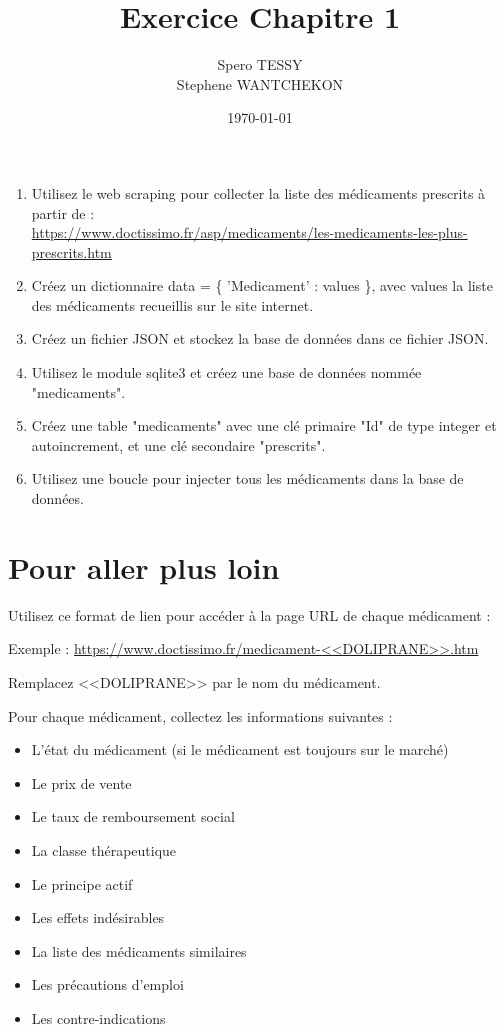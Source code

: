 \documentclass[20pt]{article}
\title{Exercice Chapitre 1}
\author{Spero TESSY \\ Stephene WANTCHEKON}
\date{\today}
\begin{document}
\maketitle

\begin{enumerate}
    \item Utilisez le web scraping pour collecter la liste des médicaments prescrits à partir de : \\ \url{https://www.doctissimo.fr/asp/medicaments/les-medicaments-les-plus-prescrits.htm}
    
    \item Créez un dictionnaire data = \{ 'Medicament' : values \}, avec values la liste des médicaments recueillis sur le site internet.
    
    \item Créez un fichier JSON et stockez la base de données dans ce fichier JSON.
    
    \item Utilisez le module sqlite3 et créez une base de données nommée "medicaments".
    
    \item Créez une table "medicaments" avec une clé primaire "Id" de type integer et autoincrement, et une clé secondaire "prescrits".
    
    \item Utilisez une boucle pour injecter tous les médicaments dans la base de données.
\end{enumerate}

\section{Pour aller plus loin}

Utilisez ce format de lien pour accéder à la page URL de chaque médicament :

Exemple : \url{https://www.doctissimo.fr/medicament-<<DOLIPRANE>>.htm}

Remplacez <<DOLIPRANE>> par le nom du médicament.

Pour chaque médicament, collectez les informations suivantes :

\begin{itemize}
    \item L'état du médicament (si le médicament est toujours sur le marché)
    \item Le prix de vente
    \item Le taux de remboursement social
    \item La classe thérapeutique
    \item Le principe actif
    \item Les effets indésirables
    \item La liste des médicaments similaires
    \item Les précautions d'emploi
    \item Les contre-indications
\end{itemize}
\end{document}
